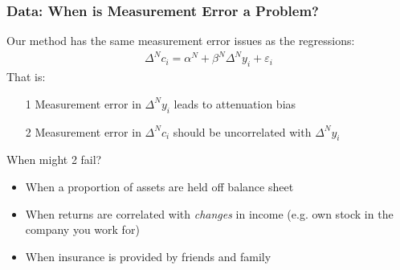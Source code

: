 \documentclass{beamer}
\begin{document}
\frame
{
	\frametitle{Data: When is Measurement Error a Problem?}
	Our method has the same measurement error issues as the regressions:
	\begin{align*}
	\Delta^N c_i = \alpha^N + \beta^N \Delta^N y_i +\varepsilon_i
	\end{align*}
	That is:
	\begin{itemize}
		\item[1] Measurement error in $\Delta^N y_i$ leads to attenuation bias
		\item[2] Measurement error in $\Delta^N c_i$ should be uncorrelated with $\Delta^N y_i$
	\end{itemize}
	\bigskip
	When might 2 fail?
	\begin{itemize}
		\item When a proportion of assets are held off balance sheet
		\item When returns are correlated with \textit{changes} in income (e.g. own stock in the company you work for)
		\item When insurance is provided by friends and family
	\end{itemize}
}
\end{document}
